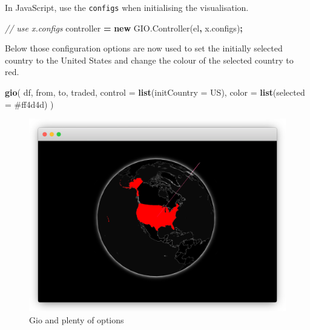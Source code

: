 \documentclass[
]{krantz}
\makeatletter
\newenvironment{Shaded}{\begin{snugshade}}{\end{snugshade}}
\newcommand{\AttributeTok}[1]{\textcolor[rgb]{0.61,0.61,0.61}{#1}}
\newcommand{\CommentTok}[1]{\textcolor[rgb]{0.37,0.37,0.37}{\textit{#1}}}
\newcommand{\DataTypeTok}[1]{\textcolor[rgb]{0.27,0.27,0.27}{#1}}
\newcommand{\KeywordTok}[1]{\textcolor[rgb]{0.27,0.27,0.27}{\textbf{#1}}}
\newcommand{\NormalTok}[1]{#1}
\newcommand{\OperatorTok}[1]{\textcolor[rgb]{0.43,0.43,0.43}{\textbf{#1}}}
\newcommand{\StringTok}[1]{\textcolor[rgb]{0.5,0.5,0.5}{#1}}
\newcommand{\VariableTok}[1]{\textcolor[rgb]{0,0,0}{#1}}
\newenvironment{kframe}{%
\medskip{}
\setlength{\fboxsep}{.8em}
 \def\at@end@of@kframe{}%
 \ifinner\ifhmode%
  \def\at@end@of@kframe{\end{minipage}}%
  \begin{minipage}{\columnwidth}%
 \fi\fi%
 \def\FrameCommand##1{\hskip\@totalleftmargin \hskip-\fboxsep
 \colorbox{shadecolor}{##1}\hskip-\fboxsep
     \hskip-\linewidth \hskip-\@totalleftmargin \hskip\columnwidth}%
 \MakeFramed {\advance\hsize-\width
   \@totalleftmargin\z@ \linewidth\hsize
   \@setminipage}}%
 {\par\unskip\endMakeFramed%
 \at@end@of@kframe}
\renewenvironment{Shaded}{\begin{kframe}}{\end{kframe}}
\makeatother
\begin{document}
In JavaScript, use the \texttt{configs} when initialising the visualisation.

\begin{Shaded}
\begin{Highlighting}[]
\CommentTok{// use x.configs}
\NormalTok{controller }\OperatorTok{=} \KeywordTok{new} \VariableTok{GIO}\NormalTok{.}\AttributeTok{Controller}\NormalTok{(el}\OperatorTok{,} \VariableTok{x}\NormalTok{.}\AttributeTok{configs}\NormalTok{)}\OperatorTok{;}
\end{Highlighting}
\end{Shaded}

Below those configuration options are now used to set the initially selected country to the United States and change the colour of the selected country to red.

\begin{Shaded}
\begin{Highlighting}[]
\KeywordTok{gio}\NormalTok{(}
\NormalTok{  df, from, to, traded, }
  \DataTypeTok{control =} \KeywordTok{list}\NormalTok{(}\DataTypeTok{initCountry =} \StringTok{\textquotesingle{}US\textquotesingle{}}\NormalTok{), }
  \DataTypeTok{color =} \KeywordTok{list}\NormalTok{(}\DataTypeTok{selected =} \StringTok{\textquotesingle{}\#ff4d4d\textquotesingle{}}\NormalTok{)}
\NormalTok{) }
\end{Highlighting}
\end{Shaded}

\begin{figure}[t]

{\centering \includegraphics[width=1\linewidth]{images/crosstalk-three-dots} 

}

\caption{Gio and plenty of options}\label{fig:crosstalk-three-dots}
\end{figure}
\end{document}

